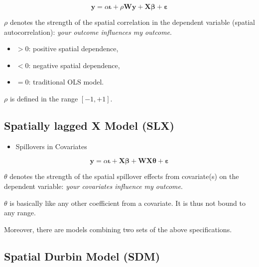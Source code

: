 \documentclass[
  letterpaper,
  DIV=11,
  numbers=noendperiod]{scrreprt}
\providecommand{\tightlist}{%
  \setlength{\itemsep}{0pt}\setlength{\parskip}{0pt}}\usepackage{longtable,booktabs,array}
\begin{document}
\[
    \begin{equation} 
        {\boldsymbol{\mathbf{y}}}=\alpha{\boldsymbol{\mathbf{\iota}}}+\rho{\boldsymbol{\mathbf{W}}}{\boldsymbol{\mathbf{y}}}+{\boldsymbol{\mathbf{X}}}{\boldsymbol{\mathbf{\beta}}}+ {\boldsymbol{\mathbf{\varepsilon}}}
        \end{equation}  
\]

\(\rho\) denotes the strength of the spatial correlation in the
dependent variable (spatial autocorrelation): \emph{your outcome
influences my outcome}.

\begin{itemize}
\tightlist
\item
  \(> 0\): positive spatial dependence,
\item
  \(< 0\): negative spatial dependence,
\item
  \(= 0\): traditional OLS model.
\end{itemize}

\(\rho\) is defined in the range \([-1, +1]\).

\hypertarget{spatially-lagged-x-model-slx}{%
\subsection{Spatially lagged X Model
(SLX)}\label{spatially-lagged-x-model-slx}}

\begin{itemize}
\tightlist
\item
  Spillovers in Covariates
\end{itemize}

\[
        \begin{equation}
        {\boldsymbol{\mathbf{y}}}=\alpha{\boldsymbol{\mathbf{\iota}}}+{\boldsymbol{\mathbf{X}}}{\boldsymbol{\mathbf{\beta}}}+{\boldsymbol{\mathbf{W}}}{\boldsymbol{\mathbf{X}}}{\boldsymbol{\mathbf{\theta}}}+ {\boldsymbol{\mathbf{\varepsilon}}}
        \end{equation}
\]

\(\theta\) denotes the strength of the spatial spillover effects from
covariate(s) on the dependent variable: \emph{your covariates influence
my outcome}.

\(\theta\) is basically like any other coefficient from a covariate. It
is thus not bound to any range.

Moreover, there are models combining two sets of the above
specifications.

\hypertarget{spatial-durbin-model-sdm}{%
\subsection{Spatial Durbin Model (SDM)}\label{spatial-durbin-model-sdm}}
\end{document}
